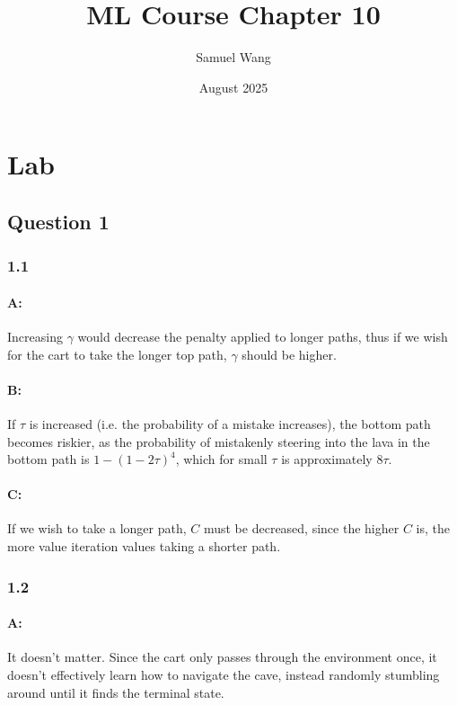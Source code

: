 \documentclass{article}
\title{ML Course Chapter 10}
\author{Samuel Wang}
\date{August 2025}
\begin{document}
\maketitle

\section{Lab}

\subsection{Question 1}

\subsubsection{1.1}

\paragraph{A: } Increasing $\gamma$ would decrease the penalty applied to longer paths, thus if we wish for the cart to take the longer top path, $\gamma$ should be higher.

\paragraph{B: } If $\tau$ is increased (i.e. the probability of a mistake increases), the bottom path becomes riskier, as the probability of mistakenly steering into the lava in the bottom path is $1-(1-2\tau)^4$, which for small $\tau$ is approximately $8\tau$.

\paragraph{C: } If we wish to take a longer path, $C$ must be decreased, since the higher $C$ is, the more value iteration values taking a shorter path.

\subsubsection{1.2}

\paragraph{A: } It doesn't matter. Since the cart only passes through the environment once, it doesn't effectively learn how to navigate the cave, instead randomly stumbling around until it finds the terminal state.
\end{document}
